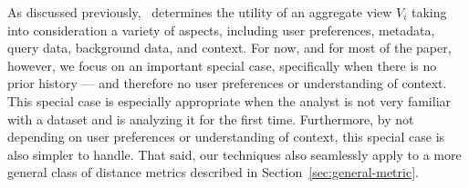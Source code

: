 




As discussed previously, \SeeDB\ determines the utility of an aggregate view $V_i$
taking into consideration a variety of aspects, including
user preferences, metadata, query data, background data, and context.
For now, and for most of the paper, however, we focus on an important special case,
specifically when there is no prior history --- and therefore no user preferences
or understanding of context.
This special case is especially appropriate when the analyst
is not very familiar with a dataset and is analyzing it for the first time.
Furthermore, by not depending on user preferences or understanding of context,
this special case is also simpler to handle.
That said, our techniques also seamlessly apply to a more general 
class of distance metrics described in Section~\ref{sec:general-metric}.

